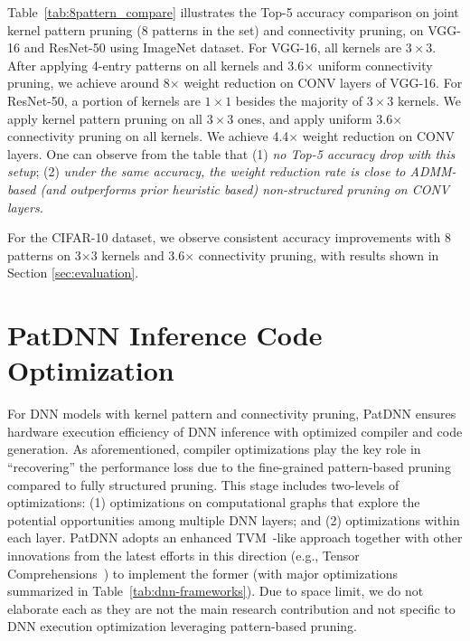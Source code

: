 \documentclass[sigplan,screen]{acmart}
\newcommand{\projectname}{PatDNN\xspace}
\begin{document}
Table~\ref{tab:8pattern_compare} illustrates the Top-5 accuracy comparison on joint kernel pattern pruning (8 patterns in the set) and connectivity pruning, on VGG-16 and ResNet-50 using ImageNet dataset. For VGG-16, all kernels are $3\times 3$. After applying 4-entry patterns on all kernels and 3.6$\times$ uniform connectivity pruning, we achieve around 8$\times$ weight reduction on CONV layers of VGG-16. For ResNet-50, a portion of kernels are $1\times 1$ besides the majority of $3\times 3$ kernels. We apply kernel pattern pruning on all $3\times 3$ ones, and apply uniform 3.6$\times$ connectivity pruning on all kernels. We achieve 4.4$\times$ weight reduction on CONV layers. One can observe from the table that (1) \emph{no Top-5 accuracy drop with this setup}; (2) \emph{under the same accuracy, the weight reduction rate is close to ADMM-based (and outperforms prior heuristic based) non-structured pruning on CONV layers.}

For the CIFAR-10 dataset, we observe consistent accuracy improvements with 8 patterns on 3$\times$3 kernels and 3.6$\times$ connectivity pruning, with results shown in Section \ref{sec:evaluation}. \section{PatDNN Inference Code Optimization}\label{sec:inference}

For DNN models with kernel pattern and connectivity pruning, \projectname ensures hardware execution
efficiency of DNN inference
with optimized compiler and code generation. 
As aforementioned, compiler optimizations
play the key role in ``recovering'' the performance
loss due to the fine-grained pattern-based
pruning compared to fully structured pruning. 
This stage includes two-levels of optimizations: (1) optimizations on computational graphs that explore the potential opportunities among multiple DNN layers;
and (2) optimizations within each layer. \projectname adopts an enhanced TVM~\cite{chen2018tvm}-like approach together with other innovations from the latest efforts in this direction (e.g., Tensor Comprehensions~\cite{vasilache2018tensor}) to implement the former (with major optimizations summarized in Table~\ref{tab:dnn-frameworks}). 
Due to space limit, we do not elaborate each
as they are not the main research contribution
and not specific to DNN execution optimization 
leveraging pattern-based pruning. 
\end{document}
